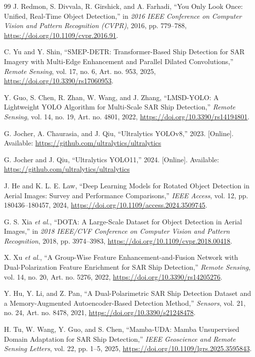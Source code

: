 \documentclass[conference]{IEEEtran}
\begin{document}
\begin{thebibliography}{99}
	 J. Redmon, S. Divvala, R. Girshick, and A. Farhadi, ``You Only Look Once: Unified, Real-Time Object Detection,'' in \emph{2016 IEEE Conference on Computer Vision and Pattern Recognition (CVPR)}, 2016, pp. 779--788, \url{https://doi.org/10.1109/cvpr.2016.91}.

	 C. Yu and Y. Shin, ``SMEP-DETR: Transformer-Based Ship Detection for SAR Imagery with Multi-Edge Enhancement and Parallel Dilated Convolutions,'' \emph{Remote Sensing}, vol. 17, no. 6, Art. no. 953, 2025, \url{https://doi.org/10.3390/rs17060953}.

	 Y. Guo, S. Chen, R. Zhan, W. Wang, and J. Zhang, ``LMSD-YOLO: A Lightweight YOLO Algorithm for Multi-Scale SAR Ship Detection,'' \emph{Remote Sensing}, vol. 14, no. 19, Art. no. 4801, 2022, \url{https://doi.org/10.3390/rs14194801}.

	 G. Jocher, A. Chaurasia, and J. Qiu, ``Ultralytics YOLOv8,'' 2023. [Online]. Available: \url{https://github.com/ultralytics/ultralytics}

	 G. Jocher and J. Qiu, ``Ultralytics YOLO11,'' 2024. [Online]. Available: \url{https://github.com/ultralytics/ultralytics}

	 J. He and K. L. E. Law, ``Deep Learning Models for Rotated Object Detection in Aerial Images: Survey and Performance Comparisons,'' \emph{IEEE Access}, vol. 12, pp. 180436--180457, 2024, \url{https://doi.org/10.1109/access.2024.3509745}.

	 G. S. Xia \textit{et al.}, ``DOTA: A Large-Scale Dataset for Object Detection in Aerial Images,'' in \emph{2018 IEEE/CVF Conference on Computer Vision and Pattern Recognition}, 2018, pp. 3974--3983, \url{https://doi.org/10.1109/cvpr.2018.00418}.

	 X. Xu \textit{et al.}, ``A Group-Wise Feature Enhancement-and-Fusion Network with Dual-Polarization Feature Enrichment for SAR Ship Detection,'' \emph{Remote Sensing}, vol. 14, no. 20, Art. no. 5276, 2022, \url{https://doi.org/10.3390/rs14205276}.

	 Y. Hu, Y. Li, and Z. Pan, ``A Dual-Polarimetric SAR Ship Detection Dataset and a Memory-Augmented Autoencoder-Based Detection Method,'' \emph{Sensors}, vol. 21, no. 24, Art. no. 8478, 2021, \url{https://doi.org/10.3390/s21248478}.

	 H. Tu, W. Wang, Y. Guo, and S. Chen, ``Mamba-UDA: Mamba Unsupervised Domain Adaptation for SAR Ship Detection,'' \emph{IEEE Geoscience and Remote Sensing Letters}, vol. 22, pp. 1--5, 2025, \url{https://doi.org/10.1109/lgrs.2025.3595843}.


\end{thebibliography}
\end{document}
